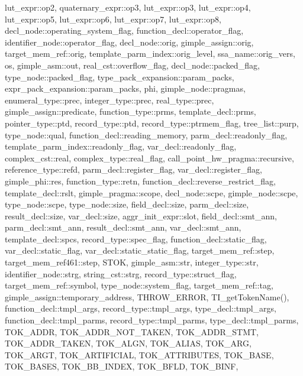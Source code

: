 lut\+\_\+expr\+::op2, quaternary\+\_\+expr\+::op3, lut\+\_\+expr\+::op3, lut\+\_\+expr\+::op4, lut\+\_\+expr\+::op5, lut\+\_\+expr\+::op6, lut\+\_\+expr\+::op7, lut\+\_\+expr\+::op8, decl\+\_\+node\+::operating\+\_\+system\+\_\+flag, function\+\_\+decl\+::operator\+\_\+flag, identifier\+\_\+node\+::operator\+\_\+flag, decl\+\_\+node\+::orig, gimple\+\_\+assign\+::orig, target\+\_\+mem\+\_\+ref\+::orig, template\+\_\+parm\+\_\+index\+::orig\+\_\+level, ssa\+\_\+name\+::orig\+\_\+vers, os, gimple\+\_\+asm\+::out, real\+\_\+cst\+::overflow\+\_\+flag, decl\+\_\+node\+::packed\+\_\+flag, type\+\_\+node\+::packed\+\_\+flag, type\+\_\+pack\+\_\+expansion\+::param\+\_\+packs, expr\+\_\+pack\+\_\+expansion\+::param\+\_\+packs, phi, gimple\+\_\+node\+::pragmas, enumeral\+\_\+type\+::prec, integer\+\_\+type\+::prec, real\+\_\+type\+::prec, gimple\+\_\+assign\+::predicate, function\+\_\+type\+::prms, template\+\_\+decl\+::prms, pointer\+\_\+type\+::ptd, record\+\_\+type\+::ptd, record\+\_\+type\+::ptrmem\+\_\+flag, tree\+\_\+list\+::purp, type\+\_\+node\+::qual, function\+\_\+decl\+::reading\+\_\+memory, parm\+\_\+decl\+::readonly\+\_\+flag, template\+\_\+parm\+\_\+index\+::readonly\+\_\+flag, var\+\_\+decl\+::readonly\+\_\+flag, complex\+\_\+cst\+::real, complex\+\_\+type\+::real\+\_\+flag, call\+\_\+point\+\_\+hw\+\_\+pragma\+::recursive, reference\+\_\+type\+::refd, parm\+\_\+decl\+::register\+\_\+flag, var\+\_\+decl\+::register\+\_\+flag, gimple\+\_\+phi\+::res, function\+\_\+type\+::retn, function\+\_\+decl\+::reverse\+\_\+restrict\+\_\+flag, template\+\_\+decl\+::rslt, gimple\+\_\+pragma\+::scope, decl\+\_\+node\+::scpe, gimple\+\_\+node\+::scpe, type\+\_\+node\+::scpe, type\+\_\+node\+::size, field\+\_\+decl\+::size, parm\+\_\+decl\+::size, result\+\_\+decl\+::size, var\+\_\+decl\+::size, aggr\+\_\+init\+\_\+expr\+::slot, field\+\_\+decl\+::smt\+\_\+ann, parm\+\_\+decl\+::smt\+\_\+ann, result\+\_\+decl\+::smt\+\_\+ann, var\+\_\+decl\+::smt\+\_\+ann, template\+\_\+decl\+::spcs, record\+\_\+type\+::spec\+\_\+flag, function\+\_\+decl\+::static\+\_\+flag, var\+\_\+decl\+::static\+\_\+flag, var\+\_\+decl\+::static\+\_\+static\+\_\+flag, target\+\_\+mem\+\_\+ref\+::step, target\+\_\+mem\+\_\+ref461\+::step, S\+T\+OK, gimple\+\_\+asm\+::str, integer\+\_\+type\+::str, identifier\+\_\+node\+::strg, string\+\_\+cst\+::strg, record\+\_\+type\+::struct\+\_\+flag, target\+\_\+mem\+\_\+ref\+::symbol, type\+\_\+node\+::system\+\_\+flag, target\+\_\+mem\+\_\+ref\+::tag, gimple\+\_\+assign\+::temporary\+\_\+address, T\+H\+R\+O\+W\+\_\+\+E\+R\+R\+OR, T\+I\+\_\+get\+Token\+Name(), function\+\_\+decl\+::tmpl\+\_\+args, record\+\_\+type\+::tmpl\+\_\+args, type\+\_\+decl\+::tmpl\+\_\+args, function\+\_\+decl\+::tmpl\+\_\+parms, record\+\_\+type\+::tmpl\+\_\+parms, type\+\_\+decl\+::tmpl\+\_\+parms, T\+O\+K\+\_\+\+A\+D\+DR, T\+O\+K\+\_\+\+A\+D\+D\+R\+\_\+\+N\+O\+T\+\_\+\+T\+A\+K\+EN, T\+O\+K\+\_\+\+A\+D\+D\+R\+\_\+\+S\+T\+MT, T\+O\+K\+\_\+\+A\+D\+D\+R\+\_\+\+T\+A\+K\+EN, T\+O\+K\+\_\+\+A\+L\+GN, T\+O\+K\+\_\+\+A\+L\+I\+AS, T\+O\+K\+\_\+\+A\+RG, T\+O\+K\+\_\+\+A\+R\+GT, T\+O\+K\+\_\+\+A\+R\+T\+I\+F\+I\+C\+I\+AL, T\+O\+K\+\_\+\+A\+T\+T\+R\+I\+B\+U\+T\+ES, T\+O\+K\+\_\+\+B\+A\+SE, T\+O\+K\+\_\+\+B\+A\+S\+ES, T\+O\+K\+\_\+\+B\+B\+\_\+\+I\+N\+D\+EX, T\+O\+K\+\_\+\+B\+F\+LD, T\+O\+K\+\_\+\+B\+I\+NF, 